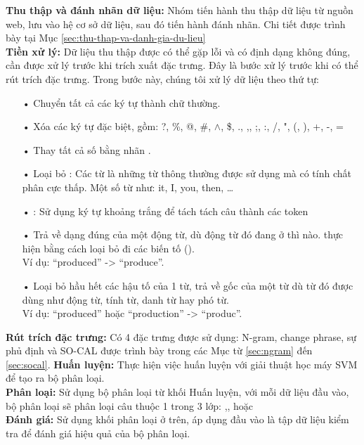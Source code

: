 \textbf{Thu thập và đánh nhãn dữ liệu:} Nhóm tiến hành thu thập dữ liệu từ nguồn web, lưu vào hệ cơ sở dữ liệu, sau đó tiến hành đánh nhãn. Chi tiết được trình bày tại Mục \ref{sec:thu-thap-va-danh-gia-du-lieu}\\
\textbf{Tiền xử lý:} Dữ liệu thu thập được có thể gặp lỗi và có định dạng không đúng, cần được xử lý trước khi trích xuất đặc trưng. 
Đây là bước xử lý trước khi có thể rút trích đặc trưng. Trong bước này, chúng tôi xử lý dữ liệu theo thứ tự:
\begin{itemize}
\item[•] Chuyển tất cả các ký tự thành chữ thường.
\item[•] Xóa các ký tự đặc biệt, gồm: ?, \%, @, \#, $\wedge$, \$, ., ,,  ;, :, /, ", (, ), +, -, =
\item[•] Thay tất cả số bằng nhãn .
\item[•] Loại bỏ : Các từ  là những từ thông thường được sử dụng mà có tính chất phân cực thấp. Một số từ  như: it, I, you, then, \ldots
\item[•] : Sử dụng ký tự khoảng trắng để tách tách câu thành các token
\item[•]  Trả về dạng đúng của một động từ, dù động từ đó đang ở thì nào.  thực hiện bằng cách loại bỏ đi các biến tố (). \\
Ví dụ: ``produced'' -> ``produce''.
\item[•]  Loại bỏ hầu hết các hậu tố của 1 từ, trả về gốc của một từ dù từ đó được dùng như động từ, tính từ, danh từ hay phó từ.\\
 Ví dụ:  ``produced'' hoặc ``production'' -> ``produc''.
\end{itemize}
\textbf{Rút trích đặc trưng:} Có 4 đặc trưng được sử dụng: N-gram, change phrase, sự phủ định và SO-CAL được trình bày trong các Mục từ \ref{sec:ngram} đến \ref{sec:socal}. 
\textbf{Huấn luyện:} Thực hiện việc huấn luyện với giải thuật học máy SVM để tạo ra bộ phân loại.\\
\textbf{Phân loại:} Sử dụng bộ phân loại từ khối Huấn luyện, với mỗi dữ liệu đầu vào, bộ phân loại sẽ phân loại câu thuộc 1 trong 3 lớp: \tichcuc,\tieucuc, hoặc \trungtinh\\
\textbf{Đánh giá:} Sử dụng khối phân loại ở trên, áp dụng đầu vào là tập dữ liệu kiểm tra để đánh giá hiệu quả của bộ phân loại.\\

